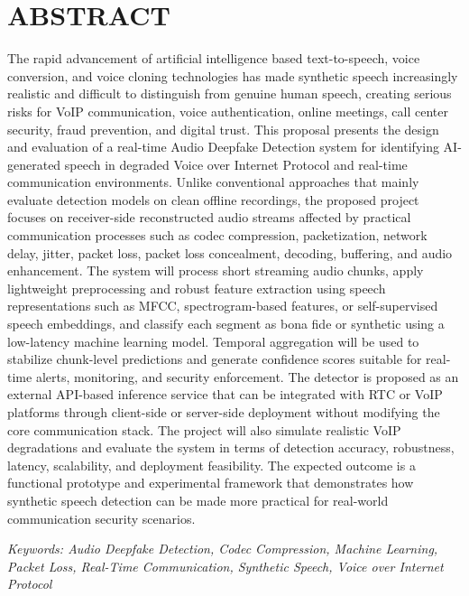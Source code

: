\newpage
\section*{ABSTRACT}  
{}

The rapid advancement of artificial intelligence based text-to-speech, voice conversion, and voice cloning technologies has made synthetic speech increasingly realistic and difficult to distinguish from genuine human speech, creating serious risks for VoIP communication, voice authentication, online meetings, call center security, fraud prevention, and digital trust. This proposal presents the design and evaluation of a real-time Audio Deepfake Detection system for identifying AI-generated speech in degraded Voice over Internet Protocol and real-time communication environments. Unlike conventional approaches that mainly evaluate detection models on clean offline recordings, the proposed project focuses on receiver-side reconstructed audio streams affected by practical communication processes such as codec compression, packetization, network delay, jitter, packet loss, packet loss concealment, decoding, buffering, and audio enhancement. The system will process short streaming audio chunks, apply lightweight preprocessing and robust feature extraction using speech representations such as MFCC, spectrogram-based features, or self-supervised speech embeddings, and classify each segment as bona fide or synthetic using a low-latency machine learning model. Temporal aggregation will be used to stabilize chunk-level predictions and generate confidence scores suitable for real-time alerts, monitoring, and security enforcement. The detector is proposed as an external API-based inference service that can be integrated with RTC or VoIP platforms through client-side or server-side deployment without modifying the core communication stack. The project will also simulate realistic VoIP degradations and evaluate the system in terms of detection accuracy, robustness, latency, scalability, and deployment feasibility. The expected outcome is a functional prototype and experimental framework that demonstrates how synthetic speech detection can be made more practical for real-world communication security scenarios.

\textit{Keywords: Audio Deepfake Detection, Codec Compression, Machine Learning, Packet Loss, Real-Time Communication, Synthetic Speech, Voice over Internet Protocol}